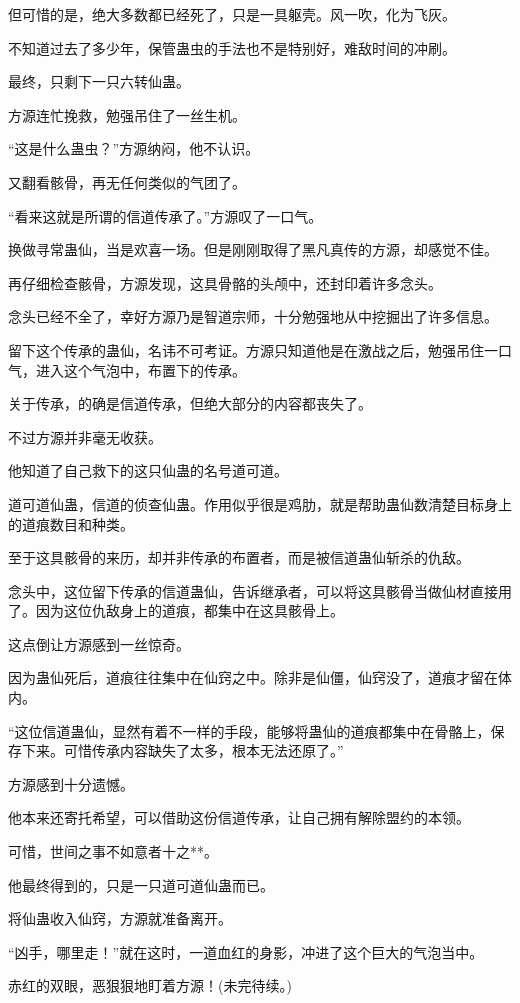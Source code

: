 \begin{this_body}
但可惜的是，绝大多数都已经死了，只是一具躯壳。风一吹，化为飞灰。

不知道过去了多少年，保管蛊虫的手法也不是特别好，难敌时间的冲刷。

最终，只剩下一只六转仙蛊。

方源连忙挽救，勉强吊住了一丝生机。

“这是什么蛊虫？”方源纳闷，他不认识。

又翻看骸骨，再无任何类似的气团了。

“看来这就是所谓的信道传承了。”方源叹了一口气。

换做寻常蛊仙，当是欢喜一场。但是刚刚取得了黑凡真传的方源，却感觉不佳。

再仔细检查骸骨，方源发现，这具骨骼的头颅中，还封印着许多念头。

念头已经不全了，幸好方源乃是智道宗师，十分勉强地从中挖掘出了许多信息。

留下这个传承的蛊仙，名讳不可考证。方源只知道他是在激战之后，勉强吊住一口气，进入这个气泡中，布置下的传承。

关于传承，的确是信道传承，但绝大部分的内容都丧失了。

不过方源并非毫无收获。

他知道了自己救下的这只仙蛊的名号道可道。

道可道仙蛊，信道的侦查仙蛊。作用似乎很是鸡肋，就是帮助蛊仙数清楚目标身上的道痕数目和种类。

至于这具骸骨的来历，却并非传承的布置者，而是被信道蛊仙斩杀的仇敌。

念头中，这位留下传承的信道蛊仙，告诉继承者，可以将这具骸骨当做仙材直接用了。因为这位仇敌身上的道痕，都集中在这具骸骨上。

这点倒让方源感到一丝惊奇。

因为蛊仙死后，道痕往往集中在仙窍之中。除非是仙僵，仙窍没了，道痕才留在体内。

“这位信道蛊仙，显然有着不一样的手段，能够将蛊仙的道痕都集中在骨骼上，保存下来。可惜传承内容缺失了太多，根本无法还原了。”

方源感到十分遗憾。

他本来还寄托希望，可以借助这份信道传承，让自己拥有解除盟约的本领。

可惜，世间之事不如意者十之**。

他最终得到的，只是一只道可道仙蛊而已。

将仙蛊收入仙窍，方源就准备离开。

“凶手，哪里走！”就在这时，一道血红的身影，冲进了这个巨大的气泡当中。

赤红的双眼，恶狠狠地盯着方源！(未完待续。)

\end{this_body}

